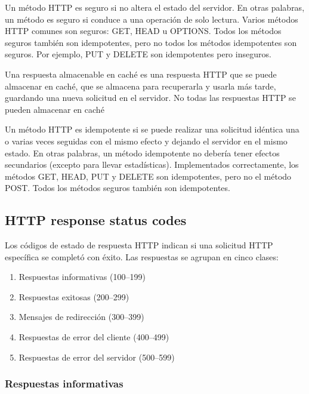 \begin{remark}
Un método HTTP es seguro si no altera el estado del servidor. En otras palabras, un método es seguro si conduce a una operación de solo lectura. Varios métodos HTTP comunes son seguros: GET, HEAD u OPTIONS. Todos los métodos seguros también son idempotentes, pero no todos los métodos idempotentes son seguros. Por ejemplo, PUT y DELETE son idempotentes pero inseguros.
\end{remark}

\begin{remark}
Una respuesta almacenable en caché es una respuesta HTTP que se puede almacenar en caché, que se almacena para recuperarla y usarla más tarde, guardando una nueva solicitud en el servidor. No todas las respuestas HTTP se pueden almacenar en caché
\end{remark}

\begin{remark}
Un método HTTP es idempotente si se puede realizar una solicitud idéntica una o varias veces seguidas con el mismo efecto y dejando el servidor en el mismo estado. En otras palabras, un método idempotente no debería tener efectos secundarios (excepto para llevar estadísticas). Implementados correctamente, los métodos GET, HEAD, PUT y DELETE son idempotentes, pero no el método POST. Todos los métodos seguros también son idempotentes.
\end{remark}

\subsection{HTTP response status codes}

Los códigos de estado de respuesta HTTP indican si una solicitud HTTP específica se completó con éxito. Las respuestas se agrupan en cinco clases:

\begin{enumerate}
	\item Respuestas informativas (100–199)
	\item Respuestas exitosas (200–299)
	\item Mensajes de redirección (300–399)
	\item Respuestas de error del cliente (400–499)
	\item Respuestas de error del servidor (500–599)
\end{enumerate}

\subsubsection{Respuestas informativas }

